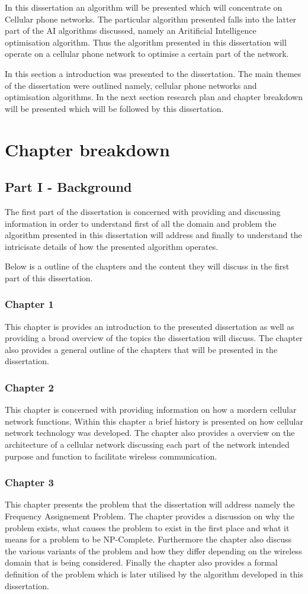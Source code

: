 In this dissertation an algorithm will be presented which will concentrate on Cellular phone networks. The particular algorithm presented falls into the latter part of the AI algorithms discussed, namely an Aritificial Intelligence optimisation algorithm. Thus the algorithm presented in this dissertation will operate on a cellular phone network to optimise a certain part of the network.

In this section a introduction was presented to the dissertation. The main themes of the dissertation were outlined namely, cellular phone networks and optimisation algorithms. In the next section research plan and chapter breakdown will be presented which will be followed by this dissertation.
\section {Chapter breakdown}
\subsection{Part I - Background}
The first part of the dissertation is concerned with providing and discussing information in order to understand first of all the domain and problem the algorithm presented in this dissertation will address and finally to understand the intricisate details of how the presented algorithm operates.

Below is a outline of the chapters and the content they will discuss in the first part of this dissertation.
\subsubsection{Chapter 1}
This chapter is provides an introduction to the presented dissertation as well as providing a broad overview of the topics the dissertation will discuss. The chapter also provides a general outline of the chapters that will be presented in the dissertation.
\subsubsection{Chapter 2}
This chapter is concerned with providing information on how a mordern cellular network functions. Within this chapter a brief history is presented on how cellular network technology was developed. The chapter also provides a overview on the architecture of a cellular network discussing each part of the network intended purpose and function to facilitate wireless communication.
\subsubsection{Chapter 3}
This chapter presents the problem that the dissertation will address namely the Frequency Assignement Problem. The chapter provides a discussion on why the problem exists, what causes the problem to exist in the first place and what it means for a problem to be NP-Complete. Furthermore the chapter also discuss the various variants of the problem and how they differ depending on the wireless domain that is being considered. Finally the chapter also provides a formal definition of the problem which is later utilised by the algorithm developed in this dissertation.
